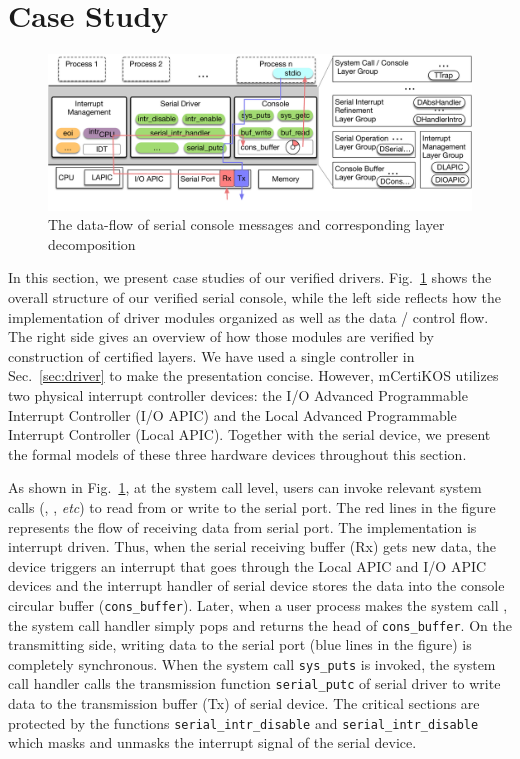 \section{Case Study}
\label{sec:case_study}

\begin{figure}
	\begin{center}
		\includegraphics[scale=0.35]{figs/data_flow}
	\end{center}
	\caption{The data-flow of serial console messages and corresponding layer decomposition}
	\label{fig:data-flow}
\end{figure}


In this section, we present case studies of our verified drivers.
Fig.~\ref{fig:data-flow} shows the overall structure of our verified serial
console, while the left side reflects how the implementation of driver modules
organized as well as the data / control flow. The right side gives an overview
of how those modules are verified by construction of certified layers. We have
used a single controller in Sec.~\ref{sec:driver} to make the presentation
concise. However, mCertiKOS utilizes two physical interrupt controller devices:
the I/O Advanced Programmable Interrupt Controller (I/O APIC) and the Local
Advanced Programmable Interrupt Controller (Local APIC). Together with the
serial device, we present the formal models of these three hardware devices
throughout this section.

As shown in Fig.~\ref{fig:data-flow}, at the system call level, users can invoke
relevant system calls (, , {\it etc}) to read
from or write to the serial port. The red lines in the figure represents the
flow of receiving data from serial port. The implementation is interrupt driven.
Thus, when the serial receiving buffer (Rx) gets new data, the device triggers
an interrupt that goes through the Local APIC and I/O APIC devices and the
interrupt handler of serial device stores the data into the console circular
buffer (\texttt{cons\_buffer}). Later, when a user process makes the system call
, the system call handler simply pops and returns the head of
\texttt{cons\_buffer}. On the transmitting side, writing data to the serial port
(blue lines in the figure) is completely synchronous. When the system call
\texttt{sys\_puts} is invoked, the system call handler calls the transmission
function \texttt{serial\_putc} of serial driver to write data to the
transmission buffer (Tx) of serial device. The critical sections are protected
by the functions \texttt{serial\_intr\_disable} and
\texttt{serial\_intr\_disable} which masks and unmasks the interrupt signal of
the serial device.

